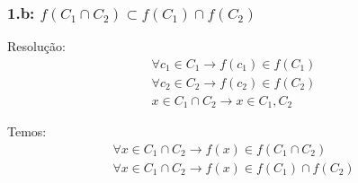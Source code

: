 \documentclass{article}
\begin{document}
    \subsubsection*{1.b: $f(C_1\cap C_2) \subset f(C_1)\cap
    f(C_2)$}
    Resolução:
    \begin{equation*}
        \begin{aligned}
            \forall c_1\in C_1 \rightarrow f(c_1)\in f(C_1) \\
            \forall c_2\in C_2 \rightarrow f(c_2)\in f(C_2) \\
            x\in C_1\cap C_2 \rightarrow x\in C_1, C_2
        \end{aligned}
    \end{equation*}

    Temos:
    \begin{equation*}
        \begin{aligned}
            \forall x\in C_1\cap C_2 \rightarrow f(x)\in
            f(C_1\cap C_2) \\
            \forall x\in C_1\cap C_2 \rightarrow f(x)\in
            f(C_1)\cap f(C_2) \\
        \end{aligned}
    \end{equation*}
\end{document}
